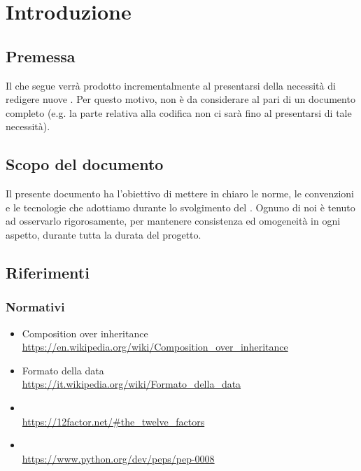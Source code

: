 \section{Introduzione} \label{Introduzione}

    

    \subsection{Premessa}
    Il  che segue verrà prodotto incrementalmente al presentarsi della necessità di redigere nuove .
    Per questo motivo, non è da considerare al pari di un documento completo (e.g. la parte relativa alla codifica non ci sarà fino
    al presentarsi di tale necessità).

    \subsection{Scopo del documento}
    Il presente documento ha l’obiettivo di mettere in chiaro le norme, le convenzioni e le tecnologie che adottiamo durante lo svolgimento del .
    Ognuno di noi \`e tenuto ad osservarlo rigorosamente, per mantenere consistenza ed omogeneit\`a in ogni aspetto, durante tutta la durata del progetto.

    


\subsection{Riferimenti}\label{Riferimenti}

    \subsubsection{Normativi}	\label{rifnorma}
    \begin{itemize}
        \item Composition over inheritance \\\url{https://en.wikipedia.org/wiki/Composition_over_inheritance}
    	\item Formato della data \\\url{https://it.wikipedia.org/wiki/Formato\_della\_data}
        \item {}\\ %
        \url{https://12factor.net/#the_twelve_factors}
        \item {} \\\url{https://www.python.org/dev/peps/pep-0008}
    \end{itemize}


